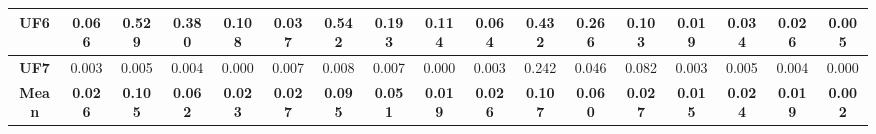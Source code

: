 \begin{table*}[t]
\begin{tabular}{c|c|c|c|c|c|c|c|c|c|c|c|c|c|c|c|c|}
\multicolumn{1}{|c|}{\textbf{UF6}} & 0.066 & 0.529 & 0.380 & 0.108 & 0.037 & 0.542 & 0.193 & 0.114 & 0.064 & 0.432 & 0.266 & 0.103 & 0.019 & 0.034 & 0.026 & 0.005 \\ \hline
\multicolumn{1}{|c|}{\textbf{UF7}} & 0.003 & 0.005 & 0.004 & 0.000 & 0.007 & 0.008 & 0.007 & 0.000 & 0.003 & 0.242 & 0.046 & 0.082 & 0.003 & 0.005 & 0.004 & 0.000 \\ \hline
\multicolumn{1}{|c|}{\textbf{Mean}} & \textbf{0.026} & \textbf{0.105} & \textbf{0.062} & \textbf{0.023} & \textbf{0.027} & \textbf{0.095} & \textbf{0.051} & \textbf{0.019} & \textbf{0.026} & \textbf{0.107} & \textbf{0.060} & \textbf{0.027} & \textbf{0.015} & \textbf{0.024} & \textbf{0.019} & \textbf{0.002} \\ \hline
\end{tabular}%
\end{table*}

